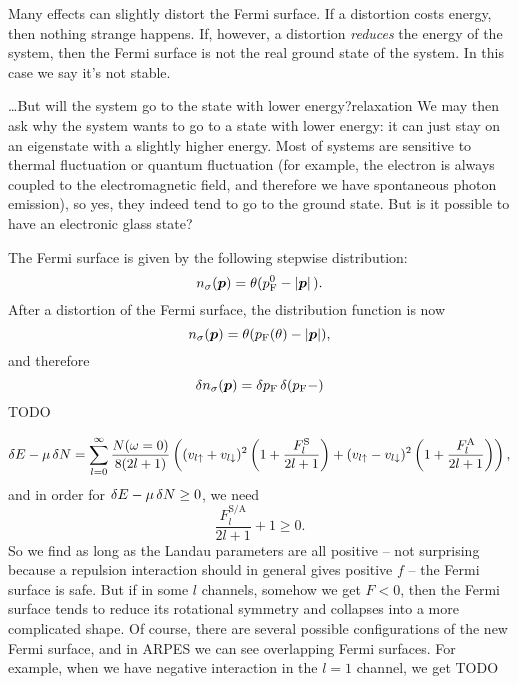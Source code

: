 \documentclass[hyperref, a4paper]{article}
\newcommand*{\pfermi}{p_{\text{F}}}
\begin{document}
Many effects can slightly distort the Fermi surface.
If a distortion costs energy, 
then nothing strange happens.
If, however, a distortion \emph{reduces} the energy of the system, 
then the Fermi surface is not the real ground state of the system.
In this case we say it's not stable.

\begin{theorybox}{\dots But will the system go to the state with lower energy?}{relaxation}
    We may then ask why the system wants to go to a state with lower energy:
    it can just stay on an eigenstate with a slightly higher energy.
    Most of systems are sensitive to thermal fluctuation 
    or quantum fluctuation 
    (for example, the electron is always coupled to the electromagnetic field, 
    and therefore we have spontaneous photon emission),
    so yes, they indeed tend to go to the ground state.
    But is it possible to have an electronic glass state?
\end{theorybox}

The Fermi surface is given by the following stepwise distribution:
\begin{equation}
    n_\sigma(\vb*{p}) = \theta(\pfermi^0 - \abs*{\vb*{p}}).
\end{equation}
After a distortion of the Fermi surface, 
the distribution function is now 
\begin{equation}
    n_\sigma(\vb*{p}) = \theta (\pfermi(\theta) - \abs{\vb*{p}}),
\end{equation}
and therefore 
\begin{equation}
    \var{n_\sigma(\vb*{p})} = 
    \var{\pfermi} \delta(\pfermi - )
\end{equation}
TODO

\begin{equation}
    \var{E} - \mu \var{N} = 
    \sum_{l=0}^{\infty} \frac{N(\omega = 0)}{8 (2 l + 1)}
    \left(
        (v_{l \uparrow} + v_{l \downarrow})^2 \left(
            1 + \frac{F^{\text{S}}_l}{2 l + 1}
        \right)
        + (v_{l \uparrow} - v_{l \downarrow})^2 \left(
            1 + \frac{F^{\text{A}}_l}{2 l + 1}
        \right)
    \right),
\end{equation}
and in order for $\var{E} - \mu \var{N} \geq 0$, we need 
\begin{equation}
    \frac{F^\text{S/A}_l}{2 l + 1} + 1 \geq 0.
\end{equation}
So we find as long as the Landau parameters are all positive -- 
not surprising because a repulsion interaction should in general gives positive $f$ -- 
the Fermi surface is safe.
But if in some $l$ channels, 
somehow we get $F < 0$,
then the Fermi surface tends to reduce its rotational symmetry
and collapses into a more complicated shape.
Of course, there are several possible configurations of 
the new Fermi surface, 
and in ARPES we can see overlapping Fermi surfaces. 
For example, when we have negative interaction in the $l = 1$ channel, 
we get TODO
\end{document}
